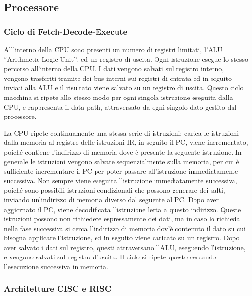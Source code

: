 \documentclass{article}
\numberwithin{equation}{subsection}
\begin{document}
\subsection{Processore}

\subsubsection{Ciclo di Fetch-Decode-Execute}

All'interno della CPU sono presenti un numero di registri limitati, l'ALU ``Arithmetic Logic Unit'', ed un registro di uscita. Ogni istruzione esegue lo stesso percorso all'interno 
della CPU. I dati vengono salvati sul registro interno, vengono trasferiti tramite dei bus interni sui registri di entrata ed in seguito inviati alla ALU e il risultato viene 
salvato su un registro di uscita. Questo ciclo macchina si ripete allo stesso modo per ogni singola istruzione eseguita dalla CPU, e rappresenta il data path, attraversato da ogni singolo dato 
gestito dal processore. 

La CPU ripete continuamente una stessa serie di istruzioni; carica le istruzioni dalla memoria al registro delle istruzioni IR, in seguito il 
PC, viene incrementato, poiché contiene l'indirizzo di memoria dove è presente la seguente istruzione. In generale le istruzioni vengono salvate 
sequenzialmente sulla memoria, per cui è sufficiente incrementare il PC per poter passare all'istruzione immediatamente successiva. Non sempre viene eseguita l'istruzione 
immediatamente successiva, poiché sono possibili istruzioni condizionali che possono generare dei salti, inviando un'indirizzo di memoria diverso dal seguente al PC. Dopo 
aver aggiornato il PC, viene decodificata l'istruzione letta a questo indirizzo. Queste istruzioni possono non richiedere espressamente dei dati, ma in caso lo 
richieda nella fase successiva si cerca l'indirizzo di memoria dov'è contenuto il dato su cui bisogna applicare l'istruzione, ed in seguito viene caricato su un registro. Dopo 
aver salvato i dati sul registro, questi attraversano l'ALU, eseguendo l'istruzione, e vengono salvati sul registro d'uscita. Il ciclo si ripete questo cercando l'esecuzione successiva in memoria. 

\subsubsection{Architetture CISC e RISC}
\end{document}
